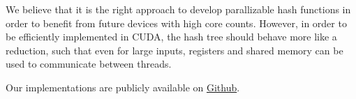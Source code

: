 \documentclass[letterpaper]{article}
\begin{document}
We believe that it is the right approach to develop parallizable hash functions in order to benefit from future devices with high core counts.
However, in order to be efficiently implemented in CUDA, the hash tree should behave more like a reduction, such that even for large inputs, registers and shared memory can be used to communicate between threads.

Our implementations are publicly available on \href{ https://github.com/Walon1998/Fast-Hashing-in-CUDA}{Github}.




\end{document}
